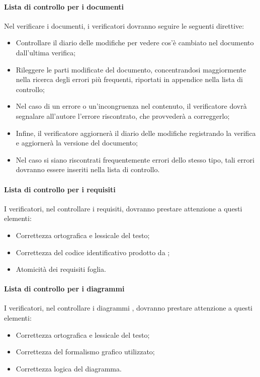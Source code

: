 \paragraph{Lista di controllo per i documenti}
Nel verificare i documenti, i verificatori dovranno seguire le seguenti direttive:
\begin{itemize}
\item Controllare il diario delle modifiche per vedere cos'è cambiato nel documento
dall'ultima verifica;
\item Rileggere le parti modificate del documento, concentrandosi maggiormente nella
ricerca degli errori più frequenti, riportati in appendice nella lista di controllo;
\item Nel caso di un errore o un'incongruenza nel contenuto, il verificatore dovrà segnalare all'autore l'errore riscontrato, che provvederà a correggerlo;
\item Infine, il verificatore aggiornerà il diario delle modifiche registrando la verifica e
aggiornerà la versione del documento;
\item Nel caso si siano riscontrati frequentemente errori dello stesso tipo, tali errori
dovranno essere inseriti nella lista di controllo.

\end{itemize}

\paragraph{Lista di controllo per i requisiti}
I verificatori, nel controllare i requisiti, dovranno prestare attenzione a questi elementi:
\begin{itemize}
\item Correttezza ortografica e lessicale del testo;
\item Correttezza del codice identificativo prodotto da ;
\item Atomicità dei requisiti foglia.
\end{itemize}

\paragraph{Lista di controllo per i diagrammi}
I verificatori, nel controllare i diagrammi , dovranno prestare attenzione a
questi elementi:
\begin{itemize}
\item Correttezza ortografica e lessicale del testo;
\item Correttezza del formalismo grafico utilizzato;
\item Correttezza logica del diagramma.
\end{itemize}

